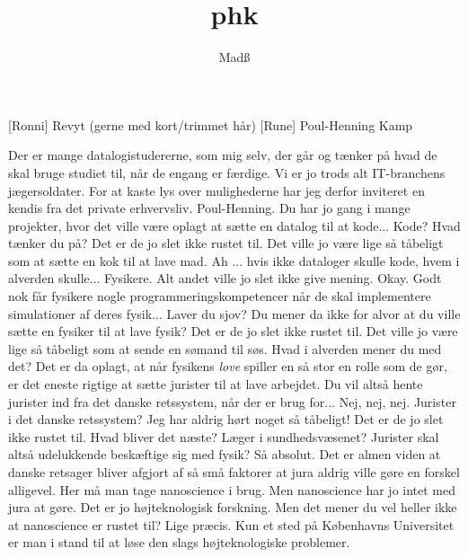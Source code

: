 \documentclass[a4paper,11pt]{article}
\title{phk}
\author{Madß}
\begin{document}
\maketitle

\begin{roles}
[Ronni] Revyt (gerne med kort/trimmet hår)
[Rune] Poul-Henning Kamp
\end{roles}

\begin{sketch}

 Der er mange datalogistudererne, som mig selv, der går og tænker på
	hvad de skal bruge studiet til, når de engang er færdige. Vi er jo
	trods alt IT-branchens jægersoldater. For at kaste lys over
	mulighederne har jeg derfor inviteret en kendis fra det private
	erhvervsliv.
 Poul-Henning. Du har jo gang i mange projekter, hvor det ville
	være oplagt at sætte en datalog til at kode...
 Kode? Hvad tænker du på? Det er de jo slet ikke rustet til. Det
	ville jo være lige så tåbeligt som at sætte en kok til at lave mad.
 Ah ... hvis ikke dataloger skulle kode, hvem i alverden skulle...
 Fysikere. Alt andet ville jo slet ikke give mening.
 Okay. Godt nok får fysikere nogle programmeringskompetencer når de
	skal implementere simulationer af deres fysik...
 Laver du sjov? Du mener da ikke for alvor at du ville sætte en
	fysiker til at lave fysik? Det er de jo slet ikke rustet til. Det
	ville jo være lige så tåbeligt som at sende en sømand til søs.
 Hvad i alverden mener du med det?
 Det er da oplagt, at når fysikens \emph{love} spiller en så stor en
	rolle som de gør, er det eneste rigtige at sætte jurister til at lave
	arbejdet.
 Du vil altså hente jurister ind fra det danske retssystem, når der
	er brug for...
 Nej, nej, nej. Jurister i det danske retssystem? Jeg har aldrig
	hørt noget så tåbeligt! Det er de jo slet ikke rustet til. Hvad
	bliver det næste? Læger i sundhedsvæsenet?
 Jurister skal altså udelukkende beskæftige sig med fysik?
 Så absolut. Det er almen viden at danske retsager bliver afgjort af
	så små faktorer at jura aldrig ville gøre en forskel alligevel. Her
	må man tage nanoscience i brug.
 Men nanoscience har jo intet med jura at gøre. Det er jo
	højteknologisk forskning. Men det mener du vel heller ikke at
	nanoscience er rustet til?
 Lige præcis. Kun et sted på Københavns Universitet er man i
	stand til at løse den slags højteknologiske problemer.

\end{sketch}
\end{document}
